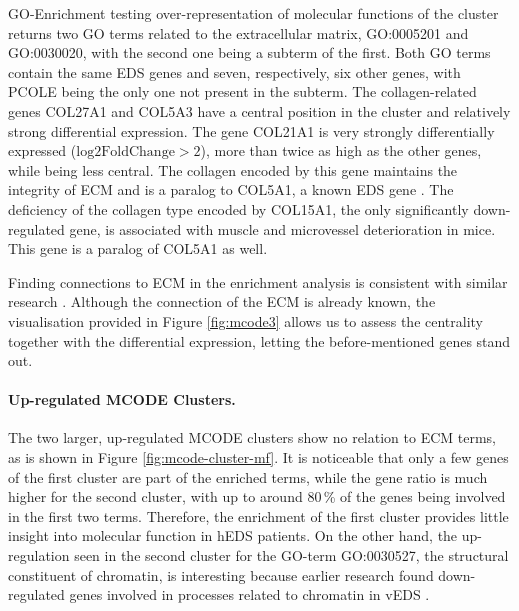 GO-Enrichment testing over-representation of molecular functions of the cluster returns two GO terms related to the extracellular matrix, GO:0005201 and GO:0030020, with the second one being a subterm of the first. Both GO terms contain the same EDS genes and seven, respectively, six other genes, with PCOLE being the only one not present in the subterm. The collagen-related genes COL27A1 and COL5A3 have a central position in the cluster and relatively strong differential expression. The gene COL21A1 is very strongly differentially expressed ($\text{log2FoldChange} > 2$), more than twice as high as the other genes, while being less central. The collagen encoded by this gene maintains the integrity of ECM and is a paralog to COL5A1, a known EDS gene \cite{COL21A1}. The deficiency of the collagen type encoded by COL15A1, the only significantly down-regulated gene, is associated with muscle and microvessel deterioration in mice. This gene is a paralog of COL5A1 as well.

Finding connections to ECM in the enrichment analysis is consistent with similar research \cite{Ritelli2022, Gensemer2021, Chiarelli2018}. Although the connection of the ECM is already known, the visualisation provided in Figure \ref{fig:mcode3} allows us to assess the centrality together with the differential expression, letting the before-mentioned genes stand out.

\paragraph{Up-regulated MCODE Clusters.} The two larger, up-regulated MCODE clusters show no relation to ECM terms, as is shown in Figure \ref{fig:mcode-cluster-mf}. It is noticeable that only a few genes of the first cluster are part of the enriched terms, while the gene ratio is much higher for the second cluster, with up to around 80\,\% of the genes being involved in the first two terms. Therefore, the enrichment of the first cluster provides little insight into molecular function in hEDS patients. On the other hand, the up-regulation seen in the second cluster for the GO-term GO:0030527, the structural constituent of chromatin, is interesting because earlier research found down-regulated genes involved in processes related to chromatin in vEDS \cite{Chiarelli2018}.


